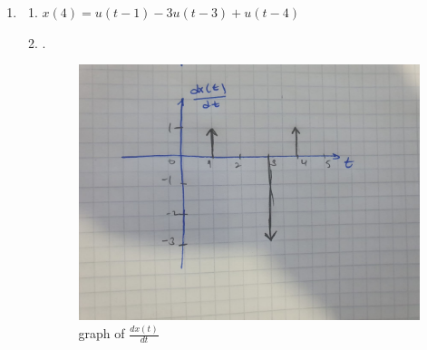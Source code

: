 \documentclass[10pt,a4paper, margin=1in]{article}
\begin{document}
\begin{enumerate}
    \item %
          \begin{enumerate}
              \item %
              $x(4) = u(t - 1) - 3u(t - 3) + u (t - 4)$
              \item %
              .\\
              \begin{figure}[H]
              \centering
              \includegraphics[scale=0.25]{hw1_q5.jpg}
              \caption{graph of $\frac{dx(t)}{dt}$}
                \end{figure}
          \end{enumerate}


\end{enumerate}
\end{document}
